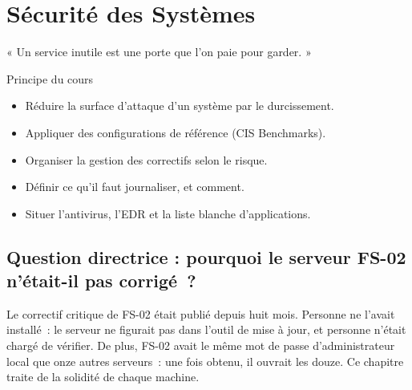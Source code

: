 
\chapter{Sécurité des Systèmes}
\label{chap:systemes}

\epigraph{%
    « Un service inutile est une porte que l'on paie pour garder. »%
}{Principe du cours}


\begin{boxobjectifs}
\begin{itemize}
    \item Réduire la surface d'attaque d'un système par le durcissement.
    \item Appliquer des configurations de référence (CIS Benchmarks).
    \item Organiser la gestion des correctifs selon le risque.
    \item Définir ce qu'il faut journaliser, et comment.
    \item Situer l'antivirus, l'EDR et la liste blanche d'applications.
\end{itemize}
\end{boxobjectifs}

\bigskip

\section*{Question directrice : pourquoi le serveur FS-02 n'était-il pas corrigé~?}

Le correctif critique de FS-02 était publié depuis huit mois. Personne ne
l'avait installé~: le serveur ne figurait pas dans l'outil de mise à jour,
et personne n'était chargé de vérifier. De plus, FS-02 avait le même mot
de passe d'administrateur local que onze autres serveurs~: une fois
obtenu, il ouvrait les douze. Ce chapitre traite de la solidité de chaque
machine.

